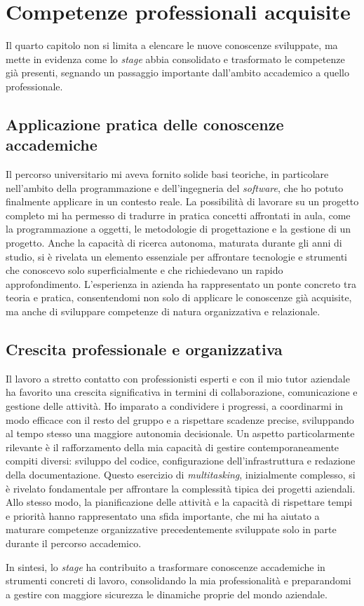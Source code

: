 \section{Competenze professionali acquisite}
Il quarto capitolo non si limita a elencare le nuove conoscenze sviluppate, ma mette in evidenza come lo \textit{stage} abbia consolidato e trasformato le competenze già presenti, segnando un passaggio importante dall'ambito accademico a quello professionale. 
\subsection*{Applicazione pratica delle conoscenze accademiche}
Il percorso universitario mi aveva fornito solide basi teoriche, in particolare nell'ambito della programmazione e dell'ingegneria del \textit{software}, che ho potuto finalmente applicare in un contesto reale. La possibilità di lavorare su un progetto completo mi ha permesso di tradurre in pratica concetti affrontati in aula, come la programmazione a oggetti, le metodologie di progettazione e la gestione di un progetto. Anche la capacità di ricerca autonoma, maturata durante gli anni di studio, si è rivelata un elemento essenziale per affrontare tecnologie e strumenti che conoscevo solo superficialmente e che richiedevano un rapido approfondimento.
L'esperienza in azienda ha rappresentato un ponte concreto tra teoria e pratica, consentendomi non solo di applicare le conoscenze già acquisite, ma anche di sviluppare competenze di natura organizzativa e relazionale. 
\subsection*{Crescita professionale e organizzativa}
Il lavoro a stretto contatto con professionisti esperti e con il mio tutor aziendale ha favorito una crescita significativa in termini di collaborazione, comunicazione e gestione delle attività. Ho imparato a condividere i progressi, a coordinarmi in modo efficace con il resto del gruppo e a rispettare scadenze precise, sviluppando al tempo stesso una maggiore autonomia decisionale.
Un aspetto particolarmente rilevante è il rafforzamento della mia capacità di gestire contemporaneamente compiti diversi: sviluppo del codice, configurazione dell'infrastruttura e redazione della documentazione. Questo esercizio di \textit{multitasking}, inizialmente complesso, si è rivelato fondamentale per affrontare la complessità tipica dei progetti aziendali. Allo stesso modo, la pianificazione delle attività e la capacità di rispettare tempi e priorità hanno rappresentato una sfida importante, che mi ha aiutato a maturare competenze organizzative precedentemente sviluppate solo in parte durante il percorso accademico.

In sintesi, lo \textit{stage} ha contribuito a trasformare conoscenze accademiche in strumenti concreti di lavoro, consolidando la mia professionalità e preparandomi a gestire con maggiore sicurezza le dinamiche proprie del mondo aziendale.
